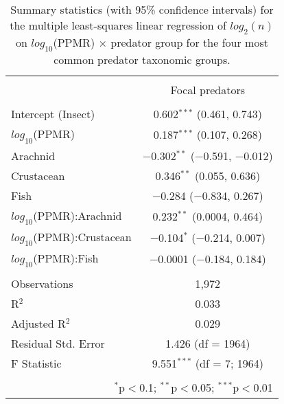 
\begin{table}[!htbp] \centering 
  \caption{Summary statistics (with 95\% confidence intervals) for the multiple least-squares linear regression of $log_2(n)$ on $log_{10}$(PPMR) $\times$ predator group for the four most common predator taxonomic groups.} 
  \label{tab:n-ppmr_byPred} 
\begin{tabular}{@{\extracolsep{5pt}}lc} 
\\[-1.8ex]\hline 
\hline \\[-1.8ex] 
 & \multicolumn{1}{c}{Focal predators} \\ 
\cline{2-2} 
\hline \\[-1.8ex] 
 Intercept (Insect) & 0.602$^{***}$ (0.461, 0.743) \\ 
  $log_{10}$(PPMR) & 0.187$^{***}$ (0.107, 0.268) \\ 
  Arachnid & $-$0.302$^{**}$ ($-$0.591, $-$0.012) \\ 
  Crustacean & 0.346$^{**}$ (0.055, 0.636) \\ 
  Fish & $-$0.284 ($-$0.834, 0.267) \\ 
  $log_{10}$(PPMR):Arachnid & 0.232$^{**}$ (0.0004, 0.464) \\ 
  $log_{10}$(PPMR):Crustacean & $-$0.104$^{*}$ ($-$0.214, 0.007) \\ 
  $log_{10}$(PPMR):Fish & $-$0.0001 ($-$0.184, 0.184) \\ 
 \hline \\[-1.8ex] 
Observations & 1,972 \\ 
R$^{2}$ & 0.033 \\ 
Adjusted R$^{2}$ & 0.029 \\ 
Residual Std. Error & 1.426 (df = 1964) \\ 
F Statistic & 9.551$^{***}$ (df = 7; 1964) \\ 
\hline 
\hline \\[-1.8ex] 
\multicolumn{2}{r}{$^{*}$p$<$0.1; $^{**}$p$<$0.05; $^{***}$p$<$0.01} \\ 
\end{tabular} 
\end{table} 
